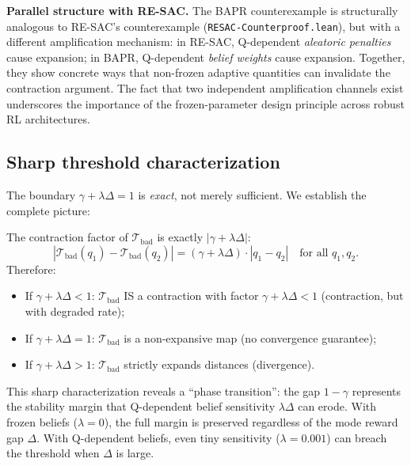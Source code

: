 \noindent\textbf{Parallel structure with RE-SAC.} The BAPR counterexample is structurally analogous to RE-SAC's counterexample (\texttt{RESAC-Counterproof.lean}), but with a different amplification mechanism: in RE-SAC, Q-dependent \emph{aleatoric penalties} cause expansion; in BAPR, Q-dependent \emph{belief weights} cause expansion. Together, they show concrete ways that non-frozen adaptive quantities can invalidate the contraction argument. The fact that two independent amplification channels exist underscores the importance of the frozen-parameter design principle across robust RL architectures.

\subsection{Sharp threshold characterization}

The boundary $\gamma + \lambda\Delta = 1$ is \emph{exact}, not merely sufficient. We establish the complete picture:

\begin{theorem}
    \label{thm:sharp_threshold}
    The contraction factor of $\mathcal{T}_{\text{bad}}$ is exactly $|\gamma + \lambda\Delta|$:
    \begin{equation}
        |\mathcal{T}_{\text{bad}}(q_1) - \mathcal{T}_{\text{bad}}(q_2)| = (\gamma + \lambda\Delta) \cdot |q_1 - q_2| \quad \text{for all } q_1, q_2.
    \end{equation}
    Therefore:
    \begin{itemize}
        \item If $\gamma + \lambda\Delta < 1$: $\mathcal{T}_{\text{bad}}$ IS a contraction with factor $\gamma + \lambda\Delta < 1$ (contraction, but with degraded rate);
        \item If $\gamma + \lambda\Delta = 1$: $\mathcal{T}_{\text{bad}}$ is a non-expansive map (no convergence guarantee);
        \item If $\gamma + \lambda\Delta > 1$: $\mathcal{T}_{\text{bad}}$ strictly expands distances (divergence).
    \end{itemize}
\end{theorem}

This sharp characterization reveals a ``phase transition'': the gap $1 - \gamma$ represents the stability margin that Q-dependent belief sensitivity $\lambda\Delta$ can erode. With frozen beliefs ($\lambda = 0$), the full margin is preserved regardless of the mode reward gap $\Delta$. With Q-dependent beliefs, even tiny sensitivity ($\lambda = 0.001$) can breach the threshold when $\Delta$ is large.


